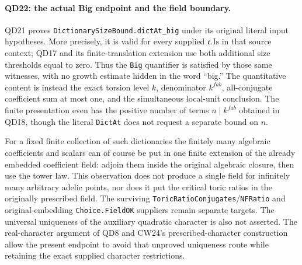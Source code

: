 \paragraph{QD22: the actual Big endpoint and the field boundary.}
QD21 proves \texttt{DictionarySizeBound.dictAt\_big} under
its original literal input hypotheses.  More precisely, it is
valid for every supplied $\mathfrak c.\mathrm{Is}$ in that
source context; QD17 and its finite-translation extension use
both additional size thresholds equal to zero.  Thus the
\texttt{Big} quantifier is satisfied by those same witnesses,
with no growth estimate hidden in the word ``big.''  The
quantitative content is instead the exact torsion level $k$,
denominator $k^{f a b}$, all-conjugate coefficient sum at most
one, and the simultaneous local-unit conclusion.  The finite
presentation even has the positive number of terms $n\mid
k^{f a b}$ obtained in QD18, though the literal \texttt{DictAt}
does not request a separate bound on $n$.

For a fixed finite collection of such dictionaries the finitely
many algebraic coefficients and scalars can of course be put
in one finite extension of the already embedded coefficient
field: adjoin them inside the original algebraic closure, then
use the tower law.  This observation does not produce a single
field for infinitely many arbitrary adelic points, nor does it
put the critical toric ratios in the originally prescribed field.
The surviving \texttt{ToricRatioConjugates}/\texttt{NFRatio}
and original-embedding \texttt{Choice.FieldOK} suppliers remain
separate targets.  The universal uniqueness of the auxiliary
quadratic character is also not asserted.  The real-character
argument of QD8 and CW24's prescribed-character construction
allow the present endpoint to avoid that unproved uniqueness
route while retaining the exact supplied character restrictions.
